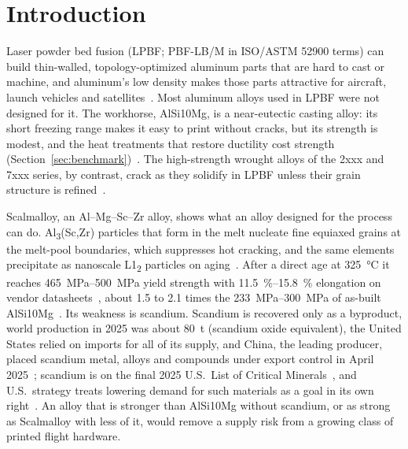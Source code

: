 \documentclass[preprint,12pt]{elsarticle}
\newcommand{\note}[1]{}
\newcommand{\note}[1]{\textcolor{blue!70!black}{\textsf{\footnotesize [Note: #1]}}}
\newcommand{\Scal}{Scalmalloy\xspace}
\newcommand{\AlSi}{AlSi10Mg\xspace}
\begin{document}
\note{Highlights (Elsevier: 3--5 bullets, at most 85 characters each, separate file). Drafts, to be fixed at G4: (1) Scandium-free Al alloy [X] printed crack-free from in-house powder. (2) Beyond the Sc-free front: stronger than commercial Al5X1 printed alongside. (3) Less critical-mineral burden than Scalmalloy, on a metric fixed in advance. (4) Four commercial powders and [N] new ones printed and tested on one machine.}

\section{Introduction}
\label{sec:intro}

Laser powder bed fusion (LPBF; PBF-LB/M in ISO/ASTM 52900 terms) can build thin-walled, topology-optimized aluminum parts that are hard to cast or machine, and aluminum's low density makes those parts attractive for aircraft, launch vehicles and satellites~\cite{debroy2018,aboulkhair2019,kotadia2021}.
Most aluminum alloys used in LPBF were not designed for it.
The workhorse, \AlSi, is a near-eutectic casting alloy: its short freezing range makes it easy to print without cracks, but its strength is modest, and the heat treatments that restore ductility cost strength (Section~\ref{sec:benchmark})~\cite{aboulkhair2019,ds_eos,ds_nikon}.
The high-strength wrought alloys of the 2xxx and 7xxx series, by contrast, crack as they solidify in LPBF unless their grain structure is refined~\cite{martin2017,kou2015}.

\Scal, an Al--Mg--Sc--Zr alloy, shows what an alloy designed for the process can do.
Al\textsubscript{3}(Sc,Zr) particles that form in the melt nucleate fine equiaxed grains at the melt-pool boundaries, which suppresses hot cracking, and the same elements precipitate as nanoscale L1\textsubscript{2} particles on aging~\cite{spierings2017}.
After a direct age at \SI{325}{\celsius} it reaches \SIrange{465}{500}{MPa} yield strength with \SIrange{11.5}{15.8}{\%} elongation on vendor datasheets~\cite{ds_colibrium,ds_3dsystems}, about 1.5 to 2.1 times the \SIrange{233}{300}{MPa} of as-built \AlSi~\cite{ds_eos,ds_nikon}.
Its weakness is scandium.
Scandium is recovered only as a byproduct, world production in 2025 was about 80~t (scandium oxide equivalent), the United States relied on imports for all of its supply, and China, the leading producer, placed scandium metal, alloys and compounds under export control in April 2025~\cite{usgs2026sc}; scandium is on the final 2025 U.S.\ List of Critical Minerals~\cite{fr2025}, and U.S.\ strategy treats lowering demand for such materials as a goal in its own right~\cite{doe2023}.
An alloy that is stronger than \AlSi without scandium, or as strong as \Scal with less of it, would remove a supply risk from a growing class of printed flight hardware.
\end{document}
